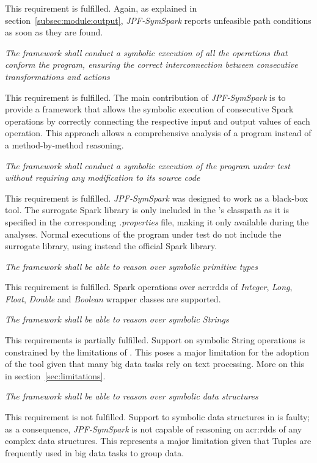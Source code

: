 \begin{itemize}
This requirement is fulfilled. Again, as explained in section~\ref{subsec:module:output}, \textit{JPF-SymSpark} reports unfeasible path conditions as soon as they are found.

 \textit{The framework shall conduct a symbolic execution of all the operations that conform the program, ensuring the correct interconnection between consecutive transformations and actions}

This requirement is fulfilled. The main contribution of \textit{JPF-SymSpark} is to provide a framework that allows the symbolic execution of consecutive Spark operations by correctly connecting the respective input and output values of each operation. This approach allows a comprehensive analysis of a program instead of a method-by-method reasoning.

 \textit{The framework shall conduct a symbolic execution of the program under test without requiring any modification to its source code}

This requirement is fulfilled. \textit{JPF-SymSpark} was designed to work as a black-box tool. The surrogate Spark library is only included in the \jpf{}'s classpath as it is specified in the corresponding \textit{.properties} file, making it only available during the analyses. Normal executions of the program under test do not include the surrogate library, using instead the official Spark library.

 \textit{The framework shall be able to reason over symbolic primitive types}

This requirement is fulfilled. Spark operations over \acrshort{acr:rdd}s of \textit{Integer}, \textit{Long}, \textit{Float}, \textit{Double} and \textit{Boolean} wrapper classes are supported.

 \textit{The framework shall be able to reason over symbolic Strings}

This requirements is partially fulfilled. Support on symbolic String operations is constrained by the limitations of \spf{}. This poses a major limitation for the adoption of the tool given that many big data tasks rely on text processing. More on this in section~\ref{sec:limitations}.

 \textit{The framework shall be able to reason over symbolic data structures}

This requirement is not fulfilled. Support to symbolic data structures in \spf{} is faulty; as a consequence, \textit{JPF-SymSpark} is not capable of reasoning on \acrshort{acr:rdd}s of any complex data structures. This represents a major limitation given that Tuples are frequently used in big data tasks to group data.


\end{itemize}
